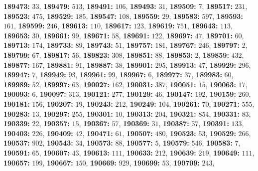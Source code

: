 \textsf{\bfseries 189473:} $33$, \textsf{\bfseries 189479:} $513$, \textsf{\bfseries 189491:} $106$, \textsf{\bfseries 189493:} $31$, \textsf{\bfseries 189509:} $7$, \textsf{\bfseries 189517:} $231$, \textsf{\bfseries 189523:} $475$, \textsf{\bfseries 189529:} $185$, \textsf{\bfseries 189547:} $108$, \textsf{\bfseries 189559:} $29$, \textsf{\bfseries 189583:} $597$, \textsf{\bfseries 189593:} $161$, \textsf{\bfseries 189599:} $246$, \textsf{\bfseries 189613:} $110$, \textsf{\bfseries 189617:} $123$, \textsf{\bfseries 189619:} $751$, \textsf{\bfseries 189643:} $113$, \textsf{\bfseries 189653:} $30$, \textsf{\bfseries 189661:} $99$, \textsf{\bfseries 189671:} $58$, \textsf{\bfseries 189691:} $122$, \textsf{\bfseries 189697:} $47$, \textsf{\bfseries 189701:} $60$, \textsf{\bfseries 189713:} $174$, \textsf{\bfseries 189733:} $89$, \textsf{\bfseries 189743:} $51$, \textsf{\bfseries 189757:} $181$, \textsf{\bfseries 189767:} $246$, \textsf{\bfseries 189797:} $2$, \textsf{\bfseries 189799:} $67$, \textsf{\bfseries 189817:} $56$, \textsf{\bfseries 189823:} $308$, \textsf{\bfseries 189851:} $88$, \textsf{\bfseries 189853:} $2$, \textsf{\bfseries 189859:} $432$, \textsf{\bfseries 189877:} $167$, \textsf{\bfseries 189881:} $91$, \textsf{\bfseries 189887:} $38$, \textsf{\bfseries 189901:} $295$, \textsf{\bfseries 189913:} $47$, \textsf{\bfseries 189929:} $296$, \textsf{\bfseries 189947:} $7$, \textsf{\bfseries 189949:} $93$, \textsf{\bfseries 189961:} $99$, \textsf{\bfseries 189967:} $6$, \textsf{\bfseries 189977:} $37$, \textsf{\bfseries 189983:} $60$, \textsf{\bfseries 189989:} $52$, \textsf{\bfseries 189997:} $63$, \textsf{\bfseries 190027:} $162$, \textsf{\bfseries 190031:} $387$, \textsf{\bfseries 190051:} $15$, \textsf{\bfseries 190063:} $17$, \textsf{\bfseries 190093:} $6$, \textsf{\bfseries 190097:} $313$, \textsf{\bfseries 190121:} $277$, \textsf{\bfseries 190129:} $46$, \textsf{\bfseries 190147:} $192$, \textsf{\bfseries 190159:} $260$, \textsf{\bfseries 190181:} $156$, \textsf{\bfseries 190207:} $19$, \textsf{\bfseries 190243:} $212$, \textsf{\bfseries 190249:} $104$, \textsf{\bfseries 190261:} $70$, \textsf{\bfseries 190271:} $555$, \textsf{\bfseries 190283:} $13$, \textsf{\bfseries 190297:} $255$, \textsf{\bfseries 190301:} $10$, \textsf{\bfseries 190313:} $204$, \textsf{\bfseries 190321:} $854$, \textsf{\bfseries 190331:} $83$, \textsf{\bfseries 190339:} $22$, \textsf{\bfseries 190357:} $15$, \textsf{\bfseries 190367:} $57$, \textsf{\bfseries 190369:} $31$, \textsf{\bfseries 190387:} $37$, \textsf{\bfseries 190391:} $133$, \textsf{\bfseries 190403:} $226$, \textsf{\bfseries 190409:} $42$, \textsf{\bfseries 190471:} $61$, \textsf{\bfseries 190507:} $480$, \textsf{\bfseries 190523:} $53$, \textsf{\bfseries 190529:} $266$, \textsf{\bfseries 190537:} $902$, \textsf{\bfseries 190543:} $34$, \textsf{\bfseries 190573:} $88$, \textsf{\bfseries 190577:} $5$, \textsf{\bfseries 190579:} $546$, \textsf{\bfseries 190583:} $7$, \textsf{\bfseries 190591:} $65$, \textsf{\bfseries 190607:} $43$, \textsf{\bfseries 190613:} $111$, \textsf{\bfseries 190633:} $212$, \textsf{\bfseries 190639:} $219$, \textsf{\bfseries 190649:} $111$, \textsf{\bfseries 190657:} $199$, \textsf{\bfseries 190667:} $150$, \textsf{\bfseries 190669:} $929$, \textsf{\bfseries 190699:} $53$, \textsf{\bfseries 190709:} $243$, 
